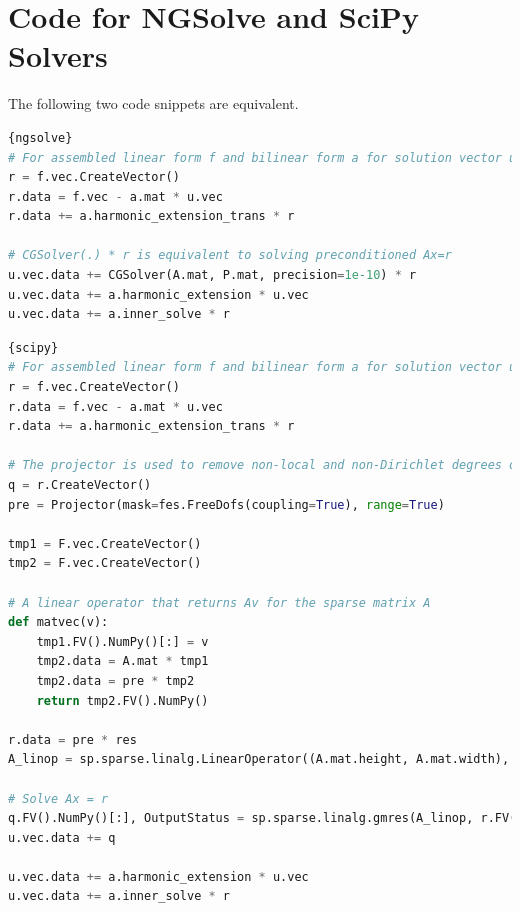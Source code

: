 \documentclass[a4paper,12]{elsarticle}
\theoremstyle{definition}
\begin{document}
\appendix
\section{Code for NGSolve and SciPy Solvers}
The following two code snippets are equivalent.
\clearpage
\begin{lstlisting}[caption=Static condensation using NGSolve,frame=tlrb, language=python]{ngsolve}
# For assembled linear form f and bilinear form a for solution vector u. 
r = f.vec.CreateVector()
r.data = f.vec - a.mat * u.vec
r.data += a.harmonic_extension_trans * r

# CGSolver(.) * r is equivalent to solving preconditioned Ax=r
u.vec.data += CGSolver(A.mat, P.mat, precision=1e-10) * r
u.vec.data += a.harmonic_extension * u.vec
u.vec.data += a.inner_solve * r
\end{lstlisting}

\begin{lstlisting}[caption=Static condensation using SciPy,frame=tlrb, language=python]{scipy}
# For assembled linear form f and bilinear form a for solution vector u. 
r = f.vec.CreateVector()
r.data = f.vec - a.mat * u.vec
r.data += a.harmonic_extension_trans * r

# The projector is used to remove non-local and non-Dirichlet degrees of freedom that should not participate in the solve
q = r.CreateVector()
pre = Projector(mask=fes.FreeDofs(coupling=True), range=True)

tmp1 = F.vec.CreateVector()
tmp2 = F.vec.CreateVector()

# A linear operator that returns Av for the sparse matrix A
def matvec(v):
	tmp1.FV().NumPy()[:] = v
	tmp2.data = A.mat * tmp1
	tmp2.data = pre * tmp2
	return tmp2.FV().NumPy()

r.data = pre * res
A_linop = sp.sparse.linalg.LinearOperator((A.mat.height, A.mat.width), matvec)

# Solve Ax = r
q.FV().NumPy()[:], OutputStatus = sp.sparse.linalg.gmres(A_linop, r.FV().NumPy(), tol=1e-10, M=P.mat)
u.vec.data += q

u.vec.data += a.harmonic_extension * u.vec
u.vec.data += a.inner_solve * r
\end{lstlisting}





\end{document}
